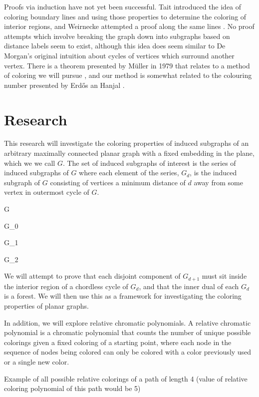 \documentclass{report}
\theoremstyle{plain}
\theoremstyle{definition}
\begin{document}
Proofs via induction have not yet been successful. Tait introduced the idea of coloring boundary lines and using those properties to determine the coloring of interior regions, and Weirnecke attempted a proof along the same lines \cite[p. 147]{4cs}. No proof attempts which involve breaking the graph down into subgraphs based on distance labels seem to exist, although this idea does seem similar to De Morgan's original intuition about cycles of vertices which surround another vertex. There is a theorem presented by Müller in 1979 that relates to a method of coloring we will pursue \cite{short-cycles}, and our method is somewhat related to the colouring number presented by Erdős an Hanjal \cite{coloring-number}.

\vspace{.75in}
\section*{Research}

This research will investigate the coloring properties of induced subgraphs of an arbitrary maximally connected planar graph with a fixed embedding in the plane, which we we call $G$. The set of induced subgraphs of interest is the series of induced subgraphs of $G$ where each element of the series, $G_d$, is the induced subgraph of $G$ consisting of vertices a minimum distance of $d$ away from some vertex in outermost cycle of $G$.

\caption{G}

\caption{G_0}

\caption{G_1}

\caption{G_2}

We will attempt to prove that each disjoint component of $G_{d+1}$ must sit inside the interior region of a chordless cycle of $G_d$, and that the inner dual of each $G_d$ is a forest. We will then use this as a framework for investigating the coloring properties of planar graphs.

In addition, we will explore relative chromatic polynomials. A relative chromatic polynomial is a chromatic polynomial that counts the number of unique possible colorings given a fixed coloring of a starting point, where each node in the sequence of nodes being colored can only be colored with a color previously used or a single new color.

\caption{Example of all possible relative colorings of a path of length 4 (value of relative coloring polynomial of this path would be 5)}



\end{document}
